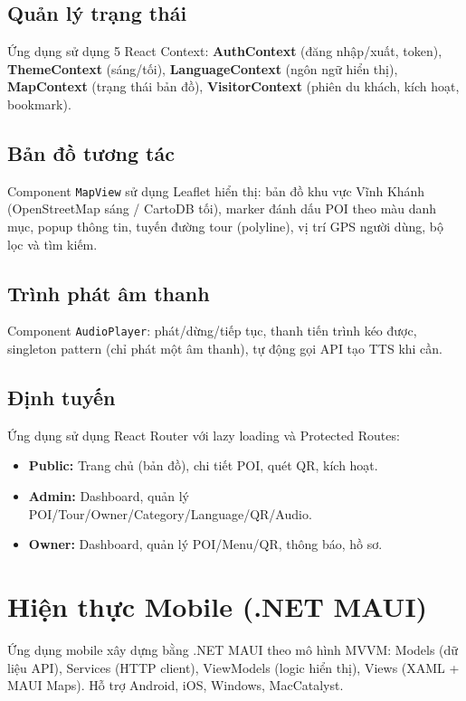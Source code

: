 \documentclass[a4paper,13pt]{report}
\begin{document}
\subsection{Quản lý trạng thái}

Ứng dụng sử dụng 5 React Context: \textbf{AuthContext} (đăng nhập/xuất, token), \textbf{ThemeContext} (sáng/tối), \textbf{LanguageContext} (ngôn ngữ hiển thị), \textbf{MapContext} (trạng thái bản đồ), \textbf{VisitorContext} (phiên du khách, kích hoạt, bookmark).

\subsection{Bản đồ tương tác}

Component \texttt{MapView} sử dụng Leaflet hiển thị: bản đồ khu vực Vĩnh Khánh (OpenStreetMap sáng / CartoDB tối), marker đánh dấu POI theo màu danh mục, popup thông tin, tuyến đường tour (polyline), vị trí GPS người dùng, bộ lọc và tìm kiếm.

\subsection{Trình phát âm thanh}

Component \texttt{AudioPlayer}: phát/dừng/tiếp tục, thanh tiến trình kéo được, singleton pattern (chỉ phát một âm thanh), tự động gọi API tạo TTS khi cần.

\subsection{Định tuyến}

Ứng dụng sử dụng React Router với lazy loading và Protected Routes:
\begin{itemize}[nosep]
  \item \textbf{Public:} Trang chủ (bản đồ), chi tiết POI, quét QR, kích hoạt.
  \item \textbf{Admin:} Dashboard, quản lý POI/Tour/Owner/Category/Language/QR/Audio.
  \item \textbf{Owner:} Dashboard, quản lý POI/Menu/QR, thông báo, hồ sơ.
\end{itemize}

\section{Hiện thực Mobile (.NET MAUI)}

Ứng dụng mobile xây dựng bằng .NET MAUI theo mô hình MVVM: Models (dữ liệu API), Services (HTTP client), ViewModels (logic hiển thị), Views (XAML + MAUI Maps). Hỗ trợ Android, iOS, Windows, MacCatalyst.
\end{document}
